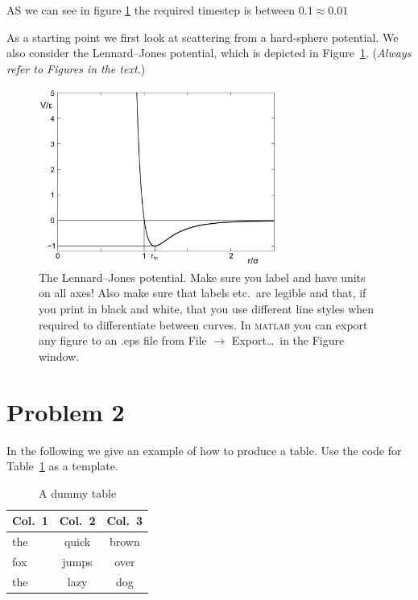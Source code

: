 AS we can see in figure \ref{fig1} the required timestep is between $ 0.1\approx0.01$



As a starting point we first look at scattering from a hard-sphere
potential. We also consider the Lennard--Jones potential, which is depicted
in Figure~\ref{fig1}. (\emph{Always refer to Figures in the text.})

\begin{figure}[!ht]
\begin{center}
  \includegraphics[width=0.7\textwidth]{template_files/LJ} 
  \caption{The Lennard--Jones potential.
  Make sure you label and have units on all axes! Also make sure that labels etc.\
  are legible and that, if you print in black and white, that you use different line
  styles when required to differentiate between curves. In \textsc{matlab}
  you can export any figure to an .eps file from File $\rightarrow$
  Export\ldots\ in the Figure window.}
  \label{fig1}
\end{center}
\end{figure}
  
\section*{Problem 2}

In the following we give an example of how to produce a table.
Use the code for Table~\ref{tab1} as a template.

\begin{table}[!ht]
  \begin{center}
    \caption{A dummy table}
    \begin{tabular}{l|c|c}\hline\hline
      \textbf{Col.~1} & \textbf{Col.~2} & \textbf{Col.~3} \\ \hline
      the & quick & brown \\ 
      fox & jumps & over \\ 
      the & lazy  & dog \\ 
      \hline\hline
    \end{tabular}
    \label{tab1}
  \end{center}
\end{table}


